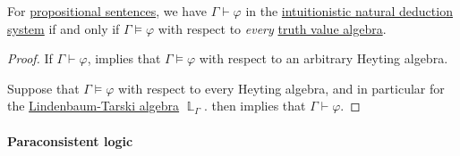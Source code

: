 \begin{corollary}\label{thm:intuitionistic_propositional_soundness_and_completeness}
  For \hyperref[def:propositional_formula]{propositional sentences}, we have \( \Gamma \vdash \varphi \) in the \hyperref[def:propositional_natural_deduction]{intuitionistic natural deduction system} if and only if \( \Gamma \vDash \varphi \) with respect to \emph{every} \hyperref[def:truth_value_algebra]{truth value algebra}.
\end{corollary}
\begin{proof}
  \SufficiencySubProof If \( \Gamma \vdash \varphi \),  implies that \( \Gamma \vDash \varphi \) with respect to an arbitrary Heyting algebra.

  \NecessitySubProof Suppose that \( \Gamma \vDash \varphi \) with respect to every Heyting algebra, and in particular for the \hyperref[def:lindenbaum_tarski_algebra]{Lindenbaum-Tarski algebra} \( \BbbL_\Gamma \).  then implies that \( \Gamma \vdash \varphi \).
\end{proof}

\paragraph{Paraconsistent logic}

